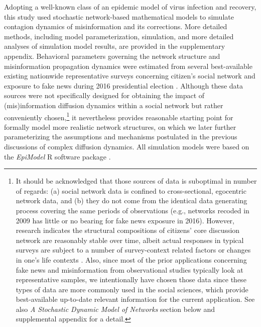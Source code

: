 \documentclass[man, 12pt, a4paper, noextraspace]{apa6}
\begin{document}
  Adopting a well-known class of an epidemic model of virus infection and recovery, this study used stochastic network-based mathematical models to simulate contagion dynamics of misinformation and its corrections. More detailed methods, including model parameterization, simulation, and more detailed analyses of simulation model results, are provided in the supplementary appendix. Behavioral parameters governing the network structure and misinformation propagation dynamics were estimated from several best-available existing nationwide representative surveys concerning citizen's social network \parencite[American National Election Study 2008–2009 Panel Survey:][]{ANES2009} and exposure to fake news during 2016 presidential election \parencite{pewfakenews}. Although these data sources were not specifically designed for obtaining the impact of (mis)information diffusion dynamics within a social network but rather conveniently chosen,\footnote{  It should be acknowledged that those sources of data is suboptimal in number of regards: (a) social network data is confined to cross-sectional, egocentric network data, and (b) they do not come from the identical data generating process covering the same periods of observations (e.g., networks recoded in 2009 has little or no bearing for fake news exposure in 2016). However, research indicates the structural compositions of citizens' core discussion network are reasonably stable over time, albeit actual responses in typical surveys are subject to a number of survey-context related factors \parencite{byungkyu2017important} or changes in one's life contexts \parencite{small2015stable}. Also, since most of the prior applications concerning fake news and misinformation from observational studies typically look at representative samples, we intentionally have chosen those data since these types of data are more commonly used in the social sciences, which provide best-available up-to-date relevant information for the current application. See also \textit{A Stochastic Dynamic Model of Networks} section below and supplemental appendix for a detail.} it nevertheless provides reasonable starting point for formally model more realistic network structures, on which we later further parameterizing the assumptions and mechanisms postulated in the previous discussions of complex diffusion dynamics. All simulation models were based on the \emph{EpiModel} R software package \parencite{epimodel}.
    
\end{document}
